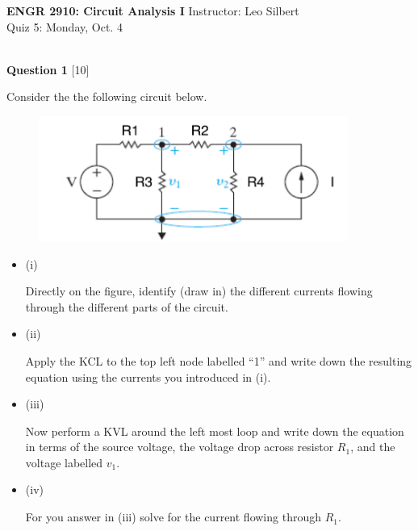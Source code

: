\documentclass[12pt]{article}
\newcommand{\bit}{\begin{itemize}}
\newcommand{\eit}{\end{itemize}}
\begin{document}

\begin{center}
\hfil
{\large\bf {ENGR 2910: Circuit Analysis I}}
\hfill Instructor: Leo Silbert \\
Quiz 5: Monday, Oct. 4\\
\hrulefill\\
\end{center}




\noindent
\noindent
{\bf Question 1} [10]

Consider the the following circuit below. 
\begin{figure}[h!]
\centering
\includegraphics[width=4.0in]{Node-Voltage.png}
\end{figure}

\bit

\item[(i)]

Directly on the figure, identify (draw in) the different currents flowing through the different parts of the circuit.

\item[(ii)] 

Apply the KCL to the top left node labelled ``1'' and write down the resulting equation using the currents you introduced in (i).

\vspace{1.5in}

\item[(iii)] 

Now perform a KVL around the left most loop and write down the equation in terms of the source voltage, the voltage drop across resistor $R_{1}$, and the voltage labelled $v_{1}$. 

\vspace{1.5in}
\item[(iv)]

For you answer in (iii) solve for the current flowing through $R_{1}$.

\eit
\end{document}
